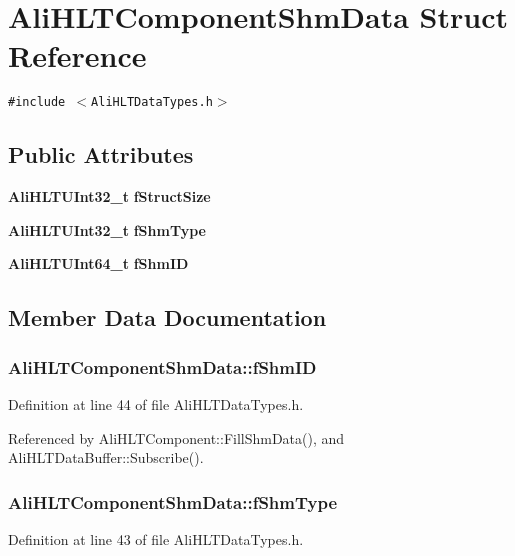 \section{Ali\-HLTComponent\-Shm\-Data Struct Reference}
\label{structAliHLTComponentShmData}
{\tt \#include $<$Ali\-HLTData\-Types.h$>$}

\subsection*{Public Attributes}
\begin{CompactItemize}
\item 
{\bf Ali\-HLTUInt32\_\-t} {\bf f\-Struct\-Size}
\item 
{\bf Ali\-HLTUInt32\_\-t} {\bf f\-Shm\-Type}
\item 
{\bf Ali\-HLTUInt64\_\-t} {\bf f\-Shm\-ID}
\end{CompactItemize}


\subsection{Member Data Documentation}
\subsubsection{ {\bf Ali\-HLTComponent\-Shm\-Data::f\-Shm\-ID}}\label{structAliHLTComponentShmData_o2}




Definition at line 44 of file Ali\-HLTData\-Types.h.

Referenced by Ali\-HLTComponent::Fill\-Shm\-Data(), and Ali\-HLTData\-Buffer::Subscribe().
\subsubsection{ {\bf Ali\-HLTComponent\-Shm\-Data::f\-Shm\-Type}}\label{structAliHLTComponentShmData_o1}




Definition at line 43 of file Ali\-HLTData\-Types.h.


